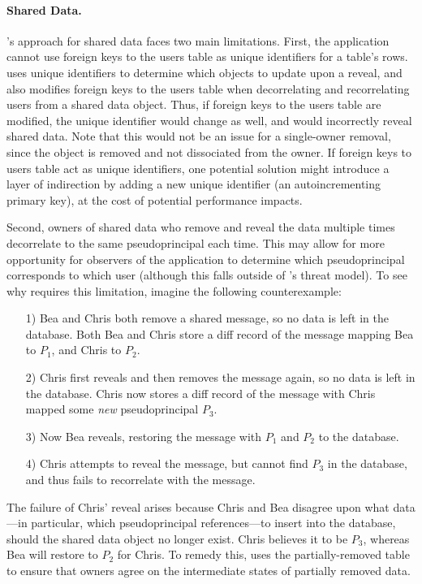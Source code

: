 \paragraph{Shared Data.}
\sys's approach for shared data faces two main limitations. First, the
application cannot use foreign keys to the users table as unique identifiers for
a table's rows. \sys uses unique identifiers to determine which objects to
update upon a reveal, and also modifies foreign keys to the users table when
decorrelating and recorrelating users from a shared data object. Thus, if
foreign keys to the users table are modified, the unique identifier would change
as well, and \sys would incorrectly reveal shared data.
%
Note that this would not be an issue for a single-owner removal, since the
object is removed and not dissociated from the owner.
%
If foreign keys to users table act as unique identifiers, one potential solution
might introduce a layer of indirection by adding a new unique identifier (\eg an
autoincrementing primary key), at the cost of potential performance impacts.

Second, owners of shared data who remove and reveal the data multiple times 
decorrelate to the same pseudoprincipal each time. This may allow for more opportunity
for observers of the application to determine which pseudoprincipal corresponds
to which user (although this falls outside of \sys's threat model).
To see why \sys requires this limitation, imagine the following counterexample:
\begin{enumerate}
    \item[1)] Bea and Chris both remove a shared message, so no data is left in
        the database. Both Bea and Chris store a diff record of the message mapping Bea to $P_1$,
        and Chris to $P_2$. 
       
    \item[2)] Chris first reveals and then removes the message again, so no data
        is left in the database. Chris now stores a diff record of the message
        with Chris mapped some \emph{new} pseudoprincipal $P_3$.
        
    \item[3)] Now Bea reveals, restoring the message with $P_1$ and $P_2$ to
        the database. 
        
    \item[4)] Chris attempts to reveal the message, but cannot find $P_3$ in the
        database, and thus fails to recorrelate with the message. 
\end{enumerate}
%
The failure of Chris' reveal arises because Chris and Bea disagree upon what
data---in particular, which pseudoprincipal references---to insert into the
database, should the shared data object no longer exist. Chris believes it to be
$P_3$, whereas Bea will restore to $P_2$ for Chris. 
To remedy this, \sys uses the partially-removed table to ensure that owners
agree on the intermediate states of partially removed data.
%


